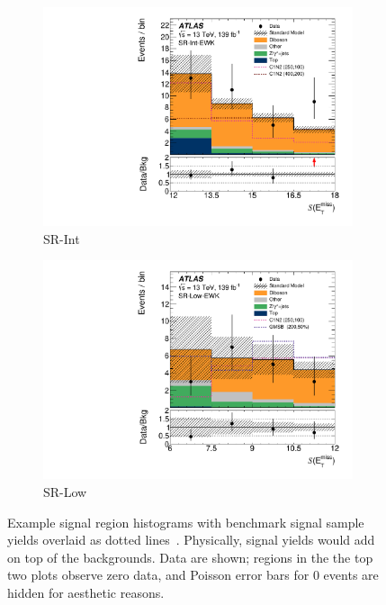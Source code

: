 \begin{figure}[tp]
\begin{subfigure}{0.49\textwidth}
    \includegraphics[width=\textwidth]{figures/2ljets_sr_int_met_sig.pdf}
    \caption{SR-Int}
\end{subfigure}
\hfill
\begin{subfigure}{0.49\textwidth}
    \centering
    \includegraphics[width=\textwidth]{figures/2ljets_sr_low_met_sig.pdf}
    \caption{SR-Low}
\end{subfigure}
\caption{%
Example signal region histograms with benchmark signal sample yields overlaid
as dotted lines~\cite{atlas2022searches}.
Physically, signal yields would add on top of the backgrounds.
Data are shown; regions in the the top two plots observe zero data, and
Poisson error bars for $0$ events are hidden for aesthetic reasons.
}
\label{fig:2ljets_signal_examples}
\end{figure}


